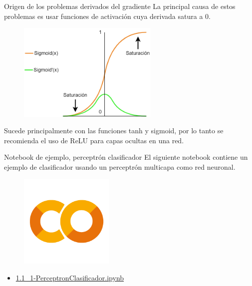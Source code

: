 \begin{frame}{Origen de los problemas derivados del gradiente}
La principal \alert{causa} de estos problemas es usar \alert{funciones de activación} cuya derivada \alert{satura a 0}.

\begin{figure}
    \centering
    \includegraphics[width=0.6\textwidth]{Slides/figures/Tema 3/GradientCause.png}
\end{figure}

Sucede principalmente con las funciones \alert{tanh} y \alert{sigmoid}, por lo tanto se \alert{recomienda} el uso de ReLU para capas ocultas en una red.
\end{frame}

\begin{frame}{Notebook de ejemplo, perceptrón clasificador}
El siguiente notebook contiene un ejemplo de clasificador usando un perceptrón multicapa como red neuronal.

\begin{figure}
    \centering
    \includegraphics[width=0.4\textwidth]{Slides/figures/GoogleColab.png}
\end{figure}
\begin{itemize}
    \centering
    \item {\Large \href{https://colab.research.google.com/github/guillermoih/M-todos-Generativos/blob/main/Notebooks/1.1_01-PerceptronClasificador.ipynb}{1.1\_1-PerceptronClasificador.ipynb}}
\end{itemize}
\end{frame}

